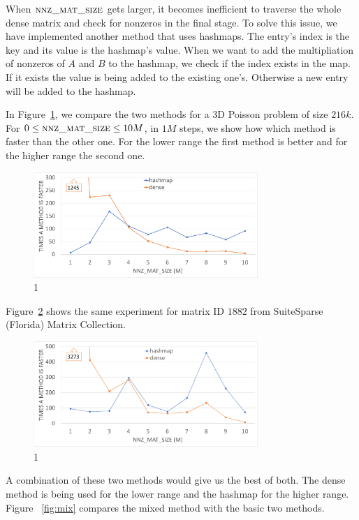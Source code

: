 When $\textsc{nnz\_mat\_size}$ gets larger, it becomes inefficient to traverse the whole dense matrix and check for nonzeros in the final stage. To solve this issue, we have implemented another method that uses hashmaps. The entry's index is the key and its value is the hashmap's value. When we want to add the multipliation of nonzeros of $A$ and $B$ to the hashmap, we check if the index exists in the map. If it exists the value is being added to the existing one's. Otherwise a new entry will be added to the hashmap.

In Figure~\ref{fig:lap60}, we compare the two methods for a 3D Poisson problem of size $216k$. For $0 \leq \textsc{nnz\_mat\_size} \leq 10M$, in $1M$ steps, we show how which method is faster than the other one. For the lower range the first method is better and for the higher range the second one.

\begin{figure}[tbh]
 \centering
 \includegraphics[width=8.5cm,height=4cm]{./figures/lap60_range.pdf}
 \caption{1}
 \label{fig:lap60}
\end{figure}

Figure~\ref{fig:eco} shows the same experiment for matrix ID $1882$ from SuiteSparse (Florida) Matrix Collection.

\begin{figure}[tbh]
 \centering
 \includegraphics[width=8.5cm,height=4cm]{./figures/eco_range.pdf}
 \caption{1}
 \label{fig:eco}
\end{figure}

A combination of these two methods would give us the best of both. The dense method is being used for the lower range and the hashmap for the higher range. Figure ~\ref{fig:mix} compares the mixed method with the basic two methods.

